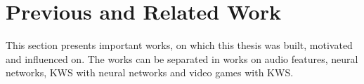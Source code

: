 
\chapter{Previous and Related Work}\label{sec:prev}
This section presents important works, on which this thesis was built, motivated and influenced on.
The works can be separated in works on audio features, neural networks, KWS with neural networks and video games with KWS.







